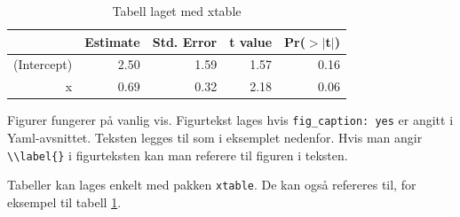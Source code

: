 \documentclass[11pt, a4paper]{article}
\begin{document}
\begin{table}[ht]
\centering
\begin{tabular}{rrrrr}
  \hline
 & Estimate & Std. Error & t value & Pr($>$$|$t$|$) \\ 
  \hline
(Intercept) & 2.50 & 1.59 & 1.57 & 0.16 \\ 
  x & 0.69 & 0.32 & 2.18 & 0.06 \\ 
   \hline
\end{tabular}
\caption{Tabell laget med xtable \label{tab1}} 
\end{table}

Figurer fungerer på vanlig vis. Figurtekst lages hvis
\texttt{fig\_caption:\ yes} er angitt i Yaml-avsnittet. Teksten legges
til som i eksemplet nedenfor. Hvis man angir
\texttt{\textbackslash{}\textbackslash{}label\{\}} i figurteksten kan
man referere til figuren i teksten.

Tabeller kan lages enkelt med pakken \texttt{xtable}. De kan også
refereres til, for eksempel til tabell \ref{tab1}.
\end{document}
